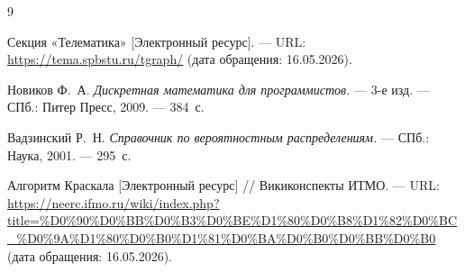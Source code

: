 \begin{thebibliography}{9}

Секция «Телематика» [Электронный ресурс]. ---
URL: \url{https://tema.spbstu.ru/tgraph/} (дата обращения: 16.05.2026).

Новиков Ф.~А. \textit{Дискретная математика для программистов.} ---
3-е изд. --- СПб.: Питер Пресс, 2009. --- 384~с.

Вадзинский Р.~Н. \textit{Справочник по вероятностным распределениям.} ---
СПб.: Наука, 2001. --- 295~с.

Алгоритм Краскала [Электронный ресурс] // Викиконспекты ИТМО. ---
URL: \url{https://neerc.ifmo.ru/wiki/index.php?title=%D0%90%D0%BB%D0%B3%D0%BE%D1%80%D0%B8%D1%82%D0%BC_%D0%9A%D1%80%D0%B0%D1%81%D0%BA%D0%B0%D0%BB%D0%B0}
(дата обращения: 16.05.2026).

\end{thebibliography}
